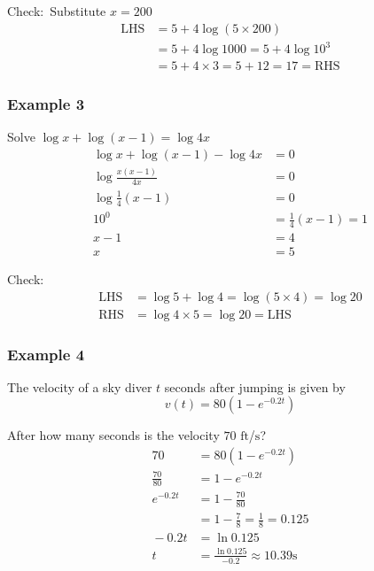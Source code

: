Check:\ Substitute $x =200$
\begin{align*}\text{LHS} &  = 5 +4 \log  \left (5 \times 200\right ) \\
 &  = 5 +4 \log  1000 =5 +4 \log  10^{3} \\
 &  = 5 +4 \times 3 =5 +12 =17 =\text{RHS}\end{align*}

\subsubsection{Example 3}
Solve $\log  x +\log  \left (x -1\right ) =\log  4 x$
\begin{align*}\log  x +\log  \left (x -1\right ) -\log  4 x &  = 0 \\
\log  \frac{x \left (x -1\right )}{4 x} &  = 0 \\
\log  \frac{1}{4} \left (x -1\right ) &  = 0 \\
\text{}10^{0} &  = \frac{1}{4} \left (x -1\right ) =1 \\
x -1 &  = 4 \\
x &  = 5\end{align*}

Check:
\begin{align*}\text{LHS} &  = \log  5 +\log  4 =\log  \left (5 \times 4\right ) =\log  20 \\
\text{RHS} &  = \log  4 \times 5 =\log  20 =\text{LHS}\end{align*}

\subsubsection{Example 4}
The velocity of a sky diver $t$ seconds after jumping is given by
\begin{equation*}v \left (t\right ) =80 \left (1 -e^{ -0.2 t}\right )
\end{equation*}

After how many seconds is the velocity $70$ $\mbox{ft}$/$\mbox{s}$?
\begin{align*}70 &  = 80 \left (1 -e^{ -0.2 t}\right ) \\
\frac{70}{80} &  = 1 -e^{ -0.2 t} \\
e^{ -0.2 t} &  = 1 -\frac{70}{80} \\
 &  = 1 -\frac{7}{8} =\frac{1}{8} =0.125 \\
\text{} -0.2 t &  = \ln  0.125 \\
t &  = \frac{\ln  0.125}{ -0.2} \approx 10.39\text{}\mbox{s}\end{align*}

